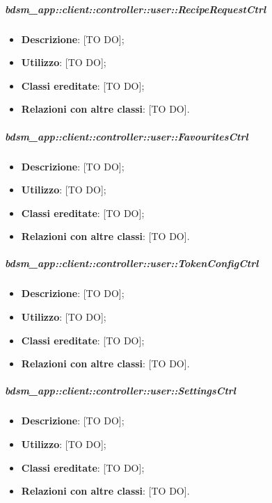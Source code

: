 		\subparagraph{bdsm\_app::client::controller::user::RecipeRequestCtrl} %
		\label{subp:client_controller_user_reciperequestctrl}
			\begin{itemize}
				\item \textbf{Descrizione}: [TO DO];
				\item \textbf{Utilizzo}: [TO DO];
				\item \textbf{Classi ereditate}: [TO DO];
				\item \textbf{Relazioni con altre classi}: [TO DO].
			\end{itemize}

		\subparagraph{bdsm\_app::client::controller::user::FavouritesCtrl} %
		\label{subp:client_controller_user_favouritesctrl}
			\begin{itemize}
				\item \textbf{Descrizione}: [TO DO];
				\item \textbf{Utilizzo}: [TO DO];
				\item \textbf{Classi ereditate}: [TO DO];
				\item \textbf{Relazioni con altre classi}: [TO DO].
			\end{itemize}

		\subparagraph{bdsm\_app::client::controller::user::TokenConfigCtrl} %
		\label{subp:client_controller_user_tokenconfigctrl}
			\begin{itemize}
				\item \textbf{Descrizione}: [TO DO];
				\item \textbf{Utilizzo}: [TO DO];
				\item \textbf{Classi ereditate}: [TO DO];
				\item \textbf{Relazioni con altre classi}: [TO DO].
			\end{itemize}


		\subparagraph{bdsm\_app::client::controller::user::SettingsCtrl} %
		\label{subp:client_controller_user_settingsctrl}
			\begin{itemize}
				\item \textbf{Descrizione}: [TO DO];
				\item \textbf{Utilizzo}: [TO DO];
				\item \textbf{Classi ereditate}: [TO DO];
				\item \textbf{Relazioni con altre classi}: [TO DO].
			\end{itemize}

